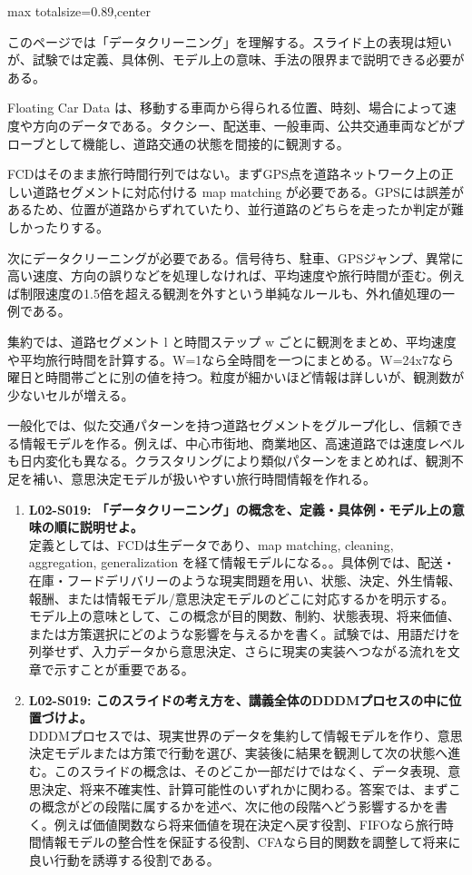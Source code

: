 \begin{minipage}[t]{0.58\textwidth}
\begin{adjustbox}{max totalsize={\textwidth}{0.89\textheight},center}
\begin{minipage}{\textwidth}\scriptsize
{}このページでは「データクリーニング」を理解する。スライド上の表現は短いが、試験では定義、具体例、モデル上の意味、手法の限界まで説明できる必要がある。\par
Floating Car Data は、移動する車両から得られる位置、時刻、場合によって速度や方向のデータである。タクシー、配送車、一般車両、公共交通車両などがプローブとして機能し、道路交通の状態を間接的に観測する。\par
FCDはそのまま旅行時間行列ではない。まずGPS点を道路ネットワーク上の正しい道路セグメントに対応付ける map matching が必要である。GPSには誤差があるため、位置が道路からずれていたり、並行道路のどちらを走ったか判定が難しかったりする。\par
次にデータクリーニングが必要である。信号待ち、駐車、GPSジャンプ、異常に高い速度、方向の誤りなどを処理しなければ、平均速度や旅行時間が歪む。例えば制限速度の1.5倍を超える観測を外すという単純なルールも、外れ値処理の一例である。\par
集約では、道路セグメント l と時間ステップ w ごとに観測をまとめ、平均速度や平均旅行時間を計算する。W=1なら全時間を一つにまとめる。W=24x7なら曜日と時間帯ごとに別の値を持つ。粒度が細かいほど情報は詳しいが、観測数が少ないセルが増える。\par
一般化では、似た交通パターンを持つ道路セグメントをグループ化し、信頼できる情報モデルを作る。例えば、中心市街地、商業地区、高速道路では速度レベルも日内変化も異なる。クラスタリングにより類似パターンをまとめれば、観測不足を補い、意思決定モデルが扱いやすい旅行時間情報を作れる。\par{}\begin{enumerate}\item \textbf{L02-S019: 「データクリーニング」の概念を、定義・具体例・モデル上の意味の順に説明せよ。}\\定義としては、FCDは生データであり、map matching, cleaning, aggregation, generalization を経て情報モデルになる。。具体例では、配送・在庫・フードデリバリーのような現実問題を用い、状態、決定、外生情報、報酬、または情報モデル/意思決定モデルのどこに対応するかを明示する。モデル上の意味として、この概念が目的関数、制約、状態表現、将来価値、または方策選択にどのような影響を与えるかを書く。試験では、用語だけを列挙せず、入力データから意思決定、さらに現実の実装へつながる流れを文章で示すことが重要である。\item \textbf{L02-S019: このスライドの考え方を、講義全体のDDDMプロセスの中に位置づけよ。}\\DDDMプロセスでは、現実世界のデータを集約して情報モデルを作り、意思決定モデルまたは方策で行動を選び、実装後に結果を観測して次の状態へ進む。このスライドの概念は、そのどこか一部だけではなく、データ表現、意思決定、将来不確実性、計算可能性のいずれかに関わる。答案では、まずこの概念がどの段階に属するかを述べ、次に他の段階へどう影響するかを書く。例えば価値関数なら将来価値を現在決定へ戻す役割、FIFOなら旅行時間情報モデルの整合性を保証する役割、CFAなら目的関数を調整して将来に良い行動を誘導する役割である。\end{enumerate}

\end{minipage}
\end{adjustbox}
\end{minipage}
